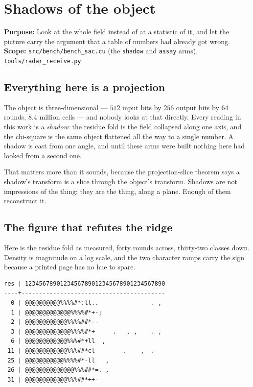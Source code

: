 \chapter{Shadows of the object}

\textbf{Purpose:} Look at the whole field instead of at a statistic of it, and let the picture
carry the argument that a table of numbers had already got wrong. \textbf{Scope:}
\texttt{src/\allowbreak{}bench/\allowbreak{}bench\_\allowbreak{}sac.\allowbreak{}cu} (the
\texttt{shadow} and \texttt{assay} arms), \texttt{tools/\allowbreak{}radar\_\allowbreak{}receive.py}.

\section{Everything here is a projection}

The object is three-dimensional --- \(512\) input bits by \(256\) output bits by \(64\) rounds,
\(8.4\) million cells --- and nobody looks at that directly. Every reading in this work is a
\emph{shadow}: the residue fold is the field collapsed along one axis, and the chi-square is the
same object flattened all the way to a single number. A shadow is cast from one angle, and until
these arms were built nothing here had looked from a second one.

That matters more than it sounds, because the projection-slice theorem says a shadow's transform is
a slice through the object's transform. Shadows are not impressions of the thing; they are the
thing, along a plane. Enough of them reconstruct it.

\section{The figure that refutes the ridge}

Here is the residue fold as measured, forty rounds across, thirty-two classes down. Density is
magnitude on a log scale, and the two character ramps carry the sign because a printed page has no
hue to spare.

\begin{verbatim}
res | 1234567890123456789012345678901234567890
----+-----------------------------------------
  0 | @@@@@@@@@@%%%%#*:ll..               . ,
  1 | @@@@@@@@@@@@@%%%%#*+-;
  2 | @@@@@@@@@@@@%%%%##*--
  3 | @@@@@@@@@@@@@%%%%#*+     .   , ,    . ,
  6 | @@@@@@@@@@@@%%%#*+ll  ,
 11 | @@@@@@@@@@@@%%%##*cl        .    ,  .
 25 | @@@@@@@@@@@%%%%#*-ll   ,
 26 | @@@@@@@@@@@@@@%%%##*=. ,
 31 | @@@@@@@@@@@@%%%##*++-
\end{verbatim}


